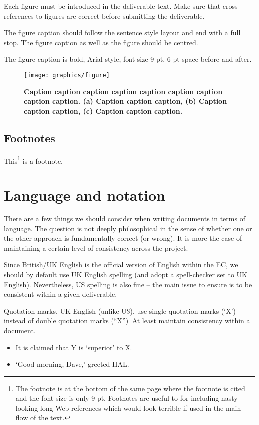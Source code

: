 \documentclass[10pt]{report}
\begin{document}
Each figure must be introduced in the deliverable text. Make sure that
cross references to figures are correct before submitting the
deliverable.

The figure caption should follow the sentence style layout and end
with a full stop. The figure caption as well as the figure should be
centred.

The figure caption is bold, Arial style, font size 9 pt, 6 pt space
before and after.

\begin{figure}[htb]
  \centering
  \texttt{[image: graphics/figure]}
  \caption{\bf Caption caption caption caption caption caption caption
    caption caption. (a) Caption caption caption, (b) Caption caption
    caption, (c) Caption caption caption.}
  \label{fig:figure}
\end{figure}

\subsection{Footnotes}

This\footnote{The footnote is at the bottom of the same page where the footnote is cited and the font size is only 9 pt. Footnotes are useful to for including nasty-looking long Web references which would look terrible if used in the main flow of the text.} is a footnote.

\section{Language and notation}

There are a few things we should consider when writing documents in
terms of language. The question is not deeply philosophical in the
sense of whether one or the other approach is fundamentally correct
(or wrong). It is more the case of maintaining a certain level of
consistency across the project.

Since British/UK English is the official version of English within the
EC, we should by default use UK English spelling (and adopt a
spell-checker set to UK English). Nevertheless, US spelling is also
fine – the main issue to ensure is to be consistent within a given
deliverable.

Quotation marks. UK English (unlike US), use single quotation marks
(‘X’) instead of double quotation marks (“X”). At least maintain
consistency within a document.

\begin{itemize}
\item  It is claimed that Y is ‘superior’ to X. 
\item  ‘Good morning, Dave,’ greeted HAL.
\end{itemize}
\end{document}

